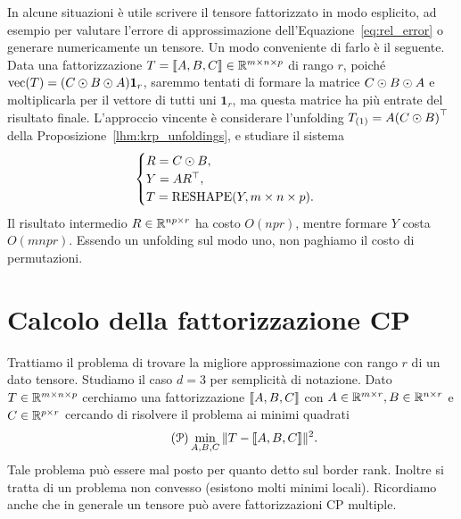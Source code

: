 In alcune situazioni è utile scrivere il tensore fattorizzato in modo esplicito, ad esempio per
valutare l'errore di approssimazione dell'Equazione~\eqref{eq:rel_error} o generare numericamente un tensore. Un modo conveniente
di farlo è il seguente. Data una fattorizzazione $ T = \dsqr{A,B,C} \in \R^{m\times n\times p} $ di
rango $ r $,
poiché $ \vec(T) = \left( C \krp B \krp A \right)\bm{1}_{r} $, saremmo tentati di formare la matrice $ C
	\mathbin{\odot} B \mathbin{\odot} A $ e moltiplicarla per il vettore di tutti uni $ \bm{1}_{r} $, ma questa matrice ha più
entrate del risultato finale. L'approccio vincente è considerare l'unfolding $ \Tm{T}{1} = A \left( C \krp B
	\right)^{\top} $ della Proposizione~\ref{lhm:krp_unfoldings}, e studiare il sistema
\begin{equation*}
	\begin{cases}
		R = C \mathbin{\odot} B,  \\
		Y = AR^{\top}, \\
		T = \operatorname{RESHAPE}(Y, m \times n\times p).
	\end{cases}
\end{equation*}
Il risultato intermedio $ R \in \mathbb{R}^{np \times r} $ ha costo $ O(npr) $, mentre formare $ Y $ costa $
	O(mnpr) $. Essendo un unfolding sul modo uno, non paghiamo il costo di permutazioni.


\section{Calcolo della fattorizzazione CP}
\label{sec:computing_cp}

Trattiamo il problema di trovare la migliore approssimazione con rango $ r $ di un dato tensore.
Studiamo il caso $ d = 3 $ per semplicità di notazione.
Dato $ T \in \mathbb{R} ^ {m \times n \times p} $ cerchiamo una fattorizzazione $ \dsqr{A, B, C} $ con
$ A \in \mathbb{R}^{m \times r}, B \in \mathbb{R}^{n\times r} $ e $ C \in \mathbb{R}^{p \times r} $ cercando di risolvere il
problema ai minimi quadrati
\begin{equation}
	\tag{$\mathcal{P}$}
	\label{eq:least_square_tensor}
	\min_{A,B,C}\| T - \dsqr{A,B,C}\|^2.
\end{equation}
Tale problema può essere mal posto per quanto detto sul border rank. Inoltre si tratta di un
problema non convesso (esistono molti minimi locali). Ricordiamo anche che in generale un tensore può avere fattorizzazioni CP multiple.

